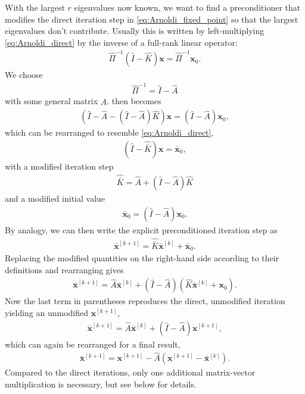 \documentclass[a4paper, twoside, 10pt, english]{article}
\numberwithin{equation}{section}
\let\vec\symbf
\begin{document}
With the largest $r$ eigenvalues now known, we want to find a preconditioner that modifies the direct iteration step in \cref{eq:Arnoldi_fixed_point} so that the largest eigenvalues don't contribute. Usually this is written by left-multiplying \cref{eq:Arnoldi_direct} by the inverse of a full-rank linear operator:
\begin{gather}
  \hat{\Pi}^{-1} \left ( \hat{I} - \hat{K} \right ) \vec{x} = \hat{\Pi}^{-1} \vec{x}_{0}. \label{eq:precon}
\end{gather}
We choose
\begin{gather}
  \hat{\Pi}^{-1} = \hat{I} - \hat{A}
\end{gather}
with some general matrix $\hat{A}$.  then becomes
\begin{gather}
  \left ( \hat{I} - \hat{A} - \left ( \hat{I} - \hat{A} \right ) \hat{K} \right ) \vec{x} = \left ( \hat{I} - \hat{A} \right ) \vec{x}_{0},
\end{gather}
which can be rearranged to resemble \cref{eq:Arnoldi_direct},
\begin{gather}
  \left ( \hat{I} - \hat{\bar{K}} \right ) \vec{x} = \bar{\vec{x}}_{0},
\end{gather}
with a modified iteration step
\begin{gather}
  \hat{\bar{K}} = \hat{A} + \left ( \hat{I} - \hat{A} \right ) \hat{K} \label{eq:Kbar}
\end{gather}
and a modified initial value
\begin{gather}
  \bar{\vec{x}}_{0} = \left ( \hat{I} - \hat{A} \right ) \vec{x}_{0}.
\end{gather}
By analogy, we can then write the explicit preconditioned iteration step as
\begin{gather}
  \bar{\vec{x}}^{[k+1]} = \hat{\bar{K}} \bar{\vec{x}}^{[k]} + \bar{\vec{x}}_{0}.
\end{gather}
Replacing the modified quantities on the right-hand side according to their definitions and rearranging gives
\begin{gather}
  \bar{\vec{x}}^{[k+1]} = \hat{A} \bar{\vec{x}}^{[k]} + \left ( \hat{I} - \hat{A} \right ) \left ( \hat{K} \bar{\vec{x}}^{[k]} + \vec{x}_{0} \right ).
\end{gather}
Now the last term in parentheses reproduces the direct, unmodified iteration yielding an unmodified $\vec{x}^{[k+1]}$,
\begin{gather}
  \bar{\vec{x}}^{[k+1]} = \hat{A} \bar{\vec{x}}^{[k]} + \left ( \hat{I} - \hat{A} \right ) \vec{x}^{[k+1]},
\end{gather}
which can again be rearranged for a final result,
\begin{gather}
  \bar{\vec{x}}^{[k+1]} = \vec{x}^{[k+1]} - \hat{A} \left ( \vec{x}^{[k+1]} - \bar{\vec{x}}^{[k]} \right ).
\end{gather}
Compared to the direct iterations, only one additional matrix-vector multiplication is necessary, but see below for details.
\end{document}
